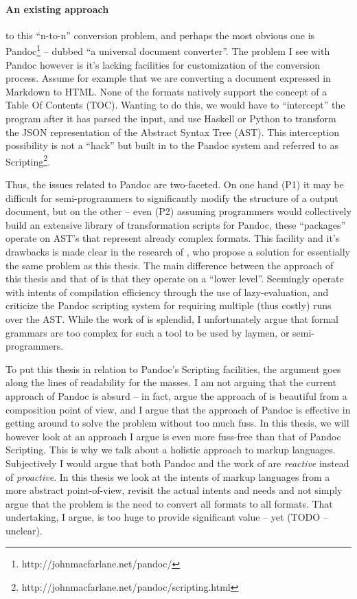 \documentclass{scrreprt}
\begin{document}
\paragraph{An existing approach} to this ``n-to-n'' conversion problem, and perhaps the most obvious one is Pandoc\footnote{http://johnmacfarlane.net/pandoc/} -- dubbed ``a universal document converter''. The problem I see with Pandoc however is it's lacking facilities for customization of the conversion process. Assume for example that we are converting a document expressed in Markdown to HTML. None of the formats natively support the concept of a Table Of Contents (TOC). Wanting to do this, we would have to ``intercept'' the program after it has parsed the input, and use Haskell or Python to transform the JSON representation of the Abstract Syntax Tree (AST). This interception possibility is not a ``hack'' but built in to the Pandoc system and referred to as Scripting\footnote{http://johnmacfarlane.net/pandoc/scripting.html}.

Thus, the issues related to Pandoc are two-faceted. On one hand (P1) it may be difficult for semi-programmers to significantly modify the structure of a output document, but on the other -- even (P2) assuming programmers would collectively build an extensive library of transformation scripts for Pandoc, these ``packages'' operate on AST's that represent already complex formats. This facility and it's drawbacks is made clear in the research of \citet{krijnen}, who propose a solution for essentially the same problem as this thesis. The main difference between the approach of this thesis and that of \citet{krijnen} is that they operate on a ``lower level''. Seemingly \citet{krijnen} operate with intents of compilation efficiency through the use of lazy-evaluation, and criticize the Pandoc scripting system for requiring multiple (thus costly) runs over the AST. While the work of \citet{krijnen} is splendid, I unfortunately argue that formal grammars are too complex for such a tool to be used by laymen, or semi-programmers.

To put this thesis in relation to Pandoc's Scripting facilities, the argument goes along the lines of readability for the masses. I am not arguing that the current approach of Pandoc is absurd -- in fact, argue the approach of \citet{krijnen} is beautiful from a composition point of view, and I argue that the approach of Pandoc is effective in getting around to solve the problem without too much fuss. In this thesis, we will however look at an approach I argue is even more fuss-free than that of Pandoc Scripting. This is why we talk about a holistic approach to markup languages. Subjectively I would argue that both Pandoc and the work of \citet{krijnen} are \emph{reactive} instead of \emph{proactive}. In this thesis we look at the intents of markup languages from a more abstract point-of-view, revisit the actual intents and needs and not simply argue that the problem is the need to convert all formats to all formats. That undertaking, I argue, is too huge to provide significant value -- yet (TODO -- unclear).
\end{document}
